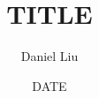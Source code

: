 \documentclass[11pt]{article}
\begin{document}
\parindent=0pt

\title{TITLE}
\author{Daniel Liu}
\date{DATE}
\maketitle
\end{document}
